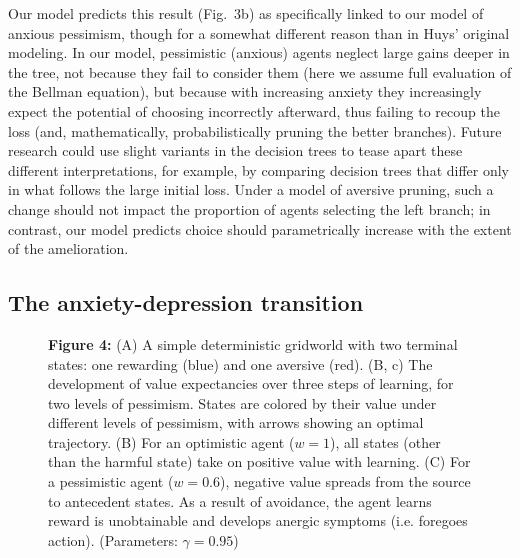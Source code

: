 \documentclass[11pt]{article} %
\begin{document}
Our model predicts this result (Fig.~3b) as specifically linked to our model of anxious pessimism, though for a somewhat different reason than in Huys' original modeling. In our model, pessimistic (anxious) agents neglect large gains deeper in the tree, not because they fail to consider them (here we assume full evaluation of the Bellman equation), but because with increasing anxiety they increasingly expect the potential of choosing incorrectly afterward, thus failing to recoup the loss (and, mathematically, probabilistically pruning the better branches). Future research could use slight variants in the decision trees to tease apart these different interpretations, for example, by comparing decision trees that differ only in what follows the large initial loss. Under a model of aversive pruning, such a change should not impact the proportion of agents selecting the left branch; in contrast, our model predicts choice should parametrically increase with the extent of the amelioration.

\subsection{The anxiety-depression transition}

\begin{figure}[!b]
  \centerline{%
  }
  \par \textbf{Figure 4:} (A) A simple deterministic gridworld with two terminal states: one rewarding (blue) and one aversive (red). (B, c) The development of value expectancies over three steps of learning, for two levels of pessimism.
  States are colored by their value under different levels of pessimism, with arrows showing an optimal trajectory. (B) For an optimistic agent ($w=1$), all states (other than the harmful state) take on positive value with learning. (C) For a pessimistic agent ($w=0.6$), negative value spreads from the source to antecedent states. As a result of avoidance, the agent learns reward is unobtainable and develops anergic symptoms (i.e. foregoes action). (Parameters: $\gamma = 0.95$)
\end{figure}
\end{document}
